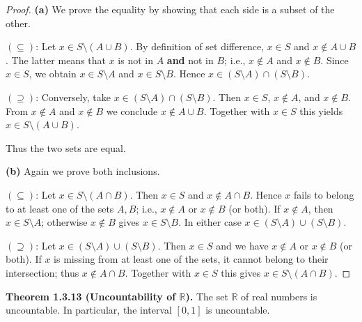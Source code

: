 \documentclass[12pt,a4paper]{article}
\theoremstyle{definition}
\newcommand{\R}{\mathbb{R}}
\begin{document}
\begin{proof}
\textbf{(a)} We prove the equality by showing that each side is a subset of the other.

\((\subseteq)\): Let \(x\in S\setminus (A\cup B)\). By definition of set difference, \(x\in S\) and \(x\notin A\cup B\). The latter means that \(x\) is not in \(A\) \textbf{and} not in \(B\); i.e., \(x\notin A\) and \(x\notin B\). Since \(x\in S\), we obtain \(x\in S\setminus A\) and \(x\in S\setminus B\). Hence \(x\in (S\setminus A)\cap (S\setminus B)\).

\((\supseteq)\): Conversely, take \(x\in (S\setminus A)\cap (S\setminus B)\). Then \(x\in S\), \(x\notin A\), and \(x\notin B\). From \(x\notin A\) and \(x\notin B\) we conclude \(x\notin A\cup B\). Together with \(x\in S\) this yields \(x\in S\setminus (A\cup B)\).

Thus the two sets are equal.

\textbf{(b)} Again we prove both inclusions.

\((\subseteq)\): Let \(x\in S\setminus (A\cap B)\). Then \(x\in S\) and \(x\notin A\cap B\). Hence \(x\) fails to belong to at least one of the sets \(A,B\); i.e., \(x\notin A\) or \(x\notin B\) (or both). If \(x\notin A\), then \(x\in S\setminus A\); otherwise \(x\notin B\) gives \(x\in S\setminus B\). In either case \(x\in (S\setminus A)\cup (S\setminus B)\).

\((\supseteq)\): Let \(x\in (S\setminus A)\cup (S\setminus B)\). Then \(x\in S\) and we have \(x\notin A\) or \(x\notin B\) (or both). If \(x\) is missing from at least one of the sets, it cannot belong to their intersection; thus \(x\notin A\cap B\). Together with \(x\in S\) this gives \(x\in S\setminus (A\cap B)\).
\end{proof}

\textbf{Theorem 1.3.13 (Uncountability of \(\R\)).} The set \(\R\) of real numbers is uncountable. In particular, the interval \([0,1]\) is uncountable.
\end{document}
